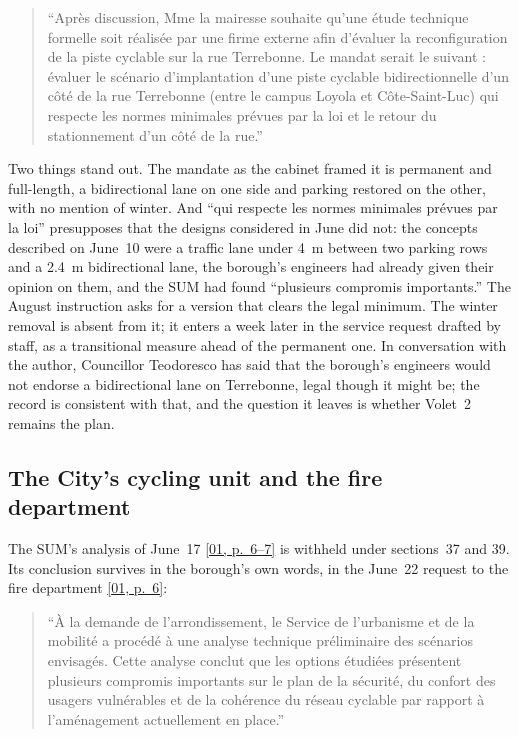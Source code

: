 \documentclass[11pt,letterpaper]{article}
\newcommand{\pagesurl}{https://openmobilitydata.github.io/Terrebonne-access-requests}
\newcommand{\pgl}[3]{\href{\pagesurl/\csname bundle#1\endcsname\#page=#2}{\textsf{\small[#1, p.~#3]}}}
\newcommand{\pg}[2]{\pgl{#1}{#2}{#2}}
\newcommand{\quot}[1]{\begin{quote}\small #1\end{quote}}
\begin{document}
\quot{``Apr\`es discussion, Mme la mairesse souhaite qu'une \'etude technique
formelle soit r\'ealis\'ee par une firme externe afin d'\'evaluer la
reconfiguration de la piste cyclable sur la rue Terrebonne. Le mandat serait
le suivant : \'evaluer le sc\'enario d'implantation d'une piste cyclable
bidirectionnelle d'un c\^ot\'e de la rue Terrebonne (entre le campus Loyola
et C\^ote-Saint-Luc) qui respecte les normes minimales pr\'evues par la loi
et le retour du stationnement d'un c\^ot\'e de la rue.''}

Two things stand out. The mandate as the cabinet framed it is permanent and
full-length, a bidirectional lane on one side and parking restored on the
other, with no mention of winter. And ``qui respecte les normes minimales
pr\'evues par la loi'' presupposes that the designs considered in June did
not: the concepts described on June~10 were a traffic lane under 4~m
between two parking rows and a 2.4~m bidirectional lane, the borough's
engineers had already given their opinion on them, and the SUM had found
``plusieurs compromis importants.'' The August instruction asks for a
version that clears the legal minimum. The winter removal is absent from it;
it enters a week later in the service request drafted by staff, as a
transitional measure ahead of the permanent one. In conversation with the
author, Councillor Teodoresco has said that the borough's engineers would
not endorse a bidirectional lane on Terrebonne, legal though it might be;
the record is consistent with that, and the question it leaves is whether
Volet~2 remains the plan.

\subsection{The City's cycling unit and the fire department}

The SUM's analysis of June~17 \pgl{01}{6}{6--7} is withheld under sections~37
and 39. Its conclusion survives in the borough's own words, in the June~22
request to the fire department \pg{01}{6}:

\quot{``\`A la demande de l'arrondissement, le Service de l'urbanisme et de la
mobilit\'e a proc\'ed\'e \`a une analyse technique pr\'eliminaire des sc\'enarios
envisag\'es. Cette analyse conclut que les options \'etudi\'ees pr\'esentent
plusieurs compromis importants sur le plan de la s\'ecurit\'e, du confort des
usagers vuln\'erables et de la coh\'erence du r\'eseau cyclable par rapport \`a
l'am\'enagement actuellement en place.''}
\end{document}
